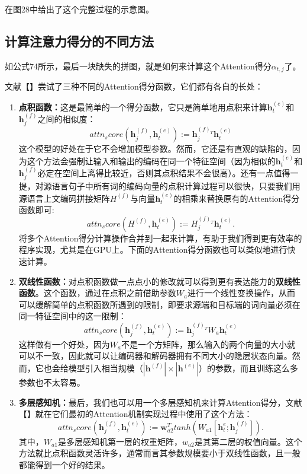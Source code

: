 \documentclass[10pt,a4paper]{ctexart}
\begin{document}
在图28中给出了这个完整过程的示意图。

\subsection{计算注意力得分的不同方法}
如公式74所示，最后一块缺失的拼图，就是如何来计算这个Attention得分$\alpha_{t,j}$了。

文献【】尝试了三种不同的Attention得分函数，它们都有各自的长处：
\begin{enumerate}
\item[] \textbf{点积函数：}这是最简单的一个得分函数，它只是简单地用点积来计算$\textbf{h}_t^{(e)}$和$\textbf{h}_j^{(f)}$之间的相似度：
\[
 attn_score(\textbf{h}_j^{(f)},\textbf{h}_t^{(e)}) := \textbf{h}_j^{(f)_{T}}\textbf{h}_t^{(e)}
\]
这个模型的好处在于它不会增加模型参数。然而，它还是有直观的缺陷的，因为这个方法会强制让输入和输出的编码在同一个特征空间（因为相似的$\textbf{h}_t^{(e)}$和$\textbf{h}_j^{(f)}$必定在空间上离得比较近，否则其点积结果不会很高）。还有一点值得一提，对源语言句子中所有词的编码向量的点积计算过程可以很快，只要我们用源语言上文编码拼接矩阵$H^{(f)}$与向量$\textbf{h}_t^{(e)}$的相乘来替换原有的Attention得分函数即可:
\[
 attn_score(H^{(f)}, \textbf{h}_t^{(e)}) := H_j^{(f)_T}\textbf{h}_t^{(e)}.
\]
将多个Attention得分计算操作合并到一起来计算，有助于我们得到更有效率的程序实现，尤其是在GPU上。下面的Attention得分函数也可以类似地进行快速计算。
\item[] \textbf{双线性函数：}对点积函数做一点点小的修改就可以得到更有表达能力的\textbf{双线性函数}。这个函数，通过在点积之前借助参数$W_a$进行一个线性变换操作，从而可以缓解简单的点积函数所遇到的限制，即要求源端和目标端的词向量必须在同一特征空间中的这一限制：
\[
 attn_score(\textbf{h}_j^{(f)},\textbf{h}_t^{(e)}) := \textbf{h}_j^{(f)_{T}}W_a\textbf{h}_t^{(e)}
\]
这样做有一个好处，因为$W_a$不是一个方矩阵，那么输入的两个向量的大小就可以不一致，因此就可以让编码器和解码器拥有不同大小的隐层状态向量。然而，它也会给模型引入相当规模（$|\textbf{h}^{(f)}| \times |\textbf{h}^{(e)}|$）的参数，而且训练这么多参数也不太容易。
\item[] \textbf{多层感知机：}最后，我们也可以用一个多层感知机来计算Attention得分，文献【】就在它们最初的Attention机制实现过程中使用了这个方法：
\[
 attn_score(\textbf{h}_j^{(f)},\textbf{h}_t^{(e)}) := \textbf{w}_{a2}^{T}tanh(W_{a1}[\textbf{h}_t^{e};\textbf{h}_j^{(f)}]).
\]
其中，$W_{a1}$是多层感知机第一层的权重矩阵，$w_{a2}$是其第二层的权值向量。这个方法就比点积函数灵活许多，通常而言其参数规模要小于双线性函数，且一般都能得到一个好的结果。
\end{enumerate}
\end{document}
